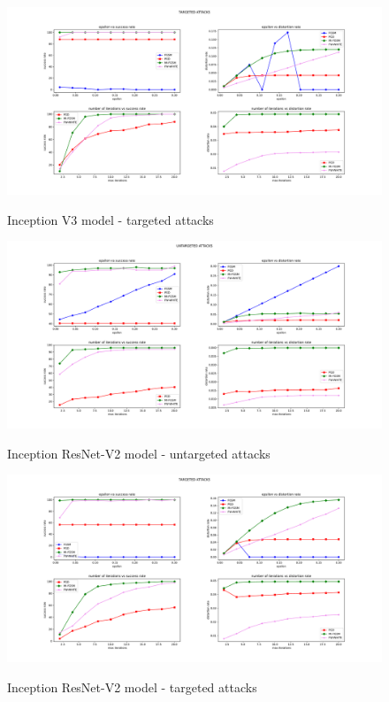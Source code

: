 \documentclass[10pt,twocolumn,letterpaper, english]{article}
\theoremstyle{definition}
\theoremstyle{plain}
\theoremstyle{plain}
\theoremstyle{plain}
\theoremstyle{plain}
\theoremstyle{remark}
\theoremstyle{remark}
\theoremstyle{definition}
\theoremstyle{definition}
\theoremstyle{definition}
\theoremstyle{definition}
\begin{document}
\begin{figure}[ht]
  \centering
  \includegraphics[width=\textwidth]{./Images/InceptionV3-targeted_grid.pdf}\\
  \caption{Inception V3 model - targeted attacks } \label{incV3-t}
\end{figure}

\begin{figure}[ht]
  \centering
  \includegraphics[width=\textwidth]{./Images/ResNet-untargeted_grid.pdf}\\
  \caption{Inception ResNet-V2 model - untargeted attacks } \label{res-unt}
\end{figure}

\begin{figure}[ht]
  \centering
  \includegraphics[width=\textwidth]{./Images/ResNet-targeted_grid.pdf}\\
  \caption{Inception ResNet-V2 model - targeted attacks } \label{res-t}
\end{figure}
\end{document}

